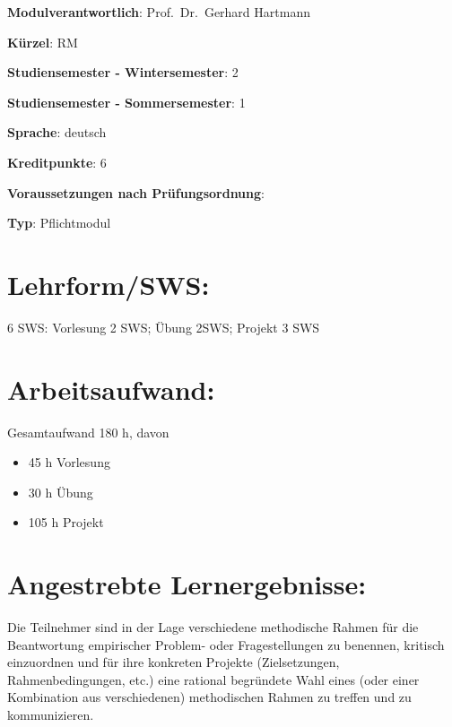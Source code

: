 \begin{modulHead}
\textbf{Modulverantwortlich}: Prof.~Dr.~Gerhard
Hartmann
\end{modulHead}
\begin{modulHead}
\textbf{Kürzel}:
RM
\end{modulHead}
\begin{modulHead}
\textbf{Studiensemester -
Wintersemester}:
2
\end{modulHead}
\begin{modulHead}
\textbf{Studiensemester -
Sommersemester}: 1
\end{modulHead}
\begin{modulHead}
\textbf{Sprache}:
deutsch
\end{modulHead}
\begin{modulHead}
\textbf{Kreditpunkte}:
6
\end{modulHead}
\begin{modulHead}
\textbf{Voraussetzungen nach
Prüfungsordnung}: 
\end{modulHead}
\begin{modulHead}
\textbf{Typ}:
Pflichtmodul
\end{modulHead}


\section*{Lehrform/SWS:}\label{lehrformsws-4}

6 SWS: Vorlesung 2 SWS; Übung 2SWS; Projekt 3 SWS

\section*{Arbeitsaufwand:}\label{arbeitsaufwand-9}

Gesamtaufwand 180 h, davon

\begin{itemize}
\tightlist
\item
  45 h Vorlesung
\item
  30 h Übung
\item
  105 h Projekt
\end{itemize}

\section*{Angestrebte
Lernergebnisse:}\label{angestrebte-lernergebnisse-3}

Die Teilnehmer sind in der Lage verschiedene methodische Rahmen für die
Beantwortung empirischer Problem- oder Fragestellungen zu benennen,
kritisch einzuordnen und für ihre konkreten Projekte (Zielsetzungen,
Rahmenbedingungen, etc.) eine rational begründete Wahl eines (oder einer
Kombination aus verschiedenen) methodischen Rahmen zu treffen und zu
kommunizieren.

